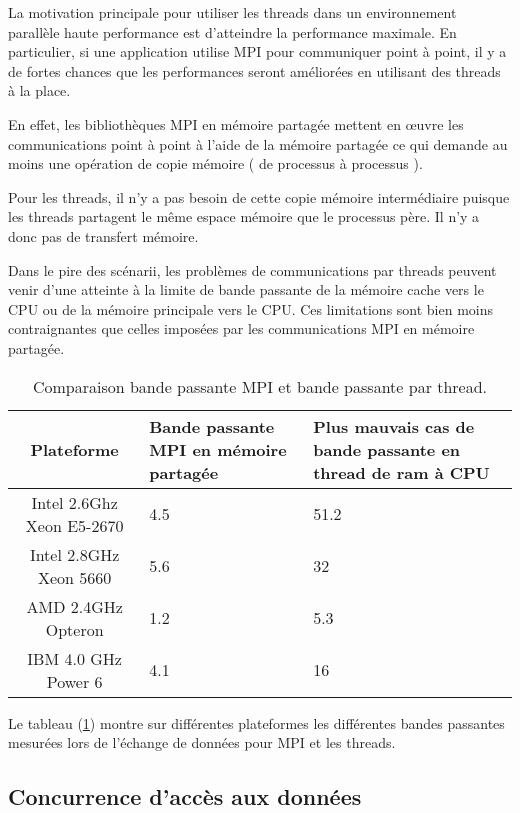 \documentclass[fleqn,11pt]{article}
\begin{document}
La motivation principale pour utiliser les threads dans un environnement parallèle haute performance est d'atteindre la performance maximale. En particulier, si une application utilise MPI pour communiquer point à point, il y a de fortes chances que les performances seront améliorées en utilisant des threads à la place.

En effet, les bibliothèques MPI en mémoire partagée mettent en {\oe}uvre les communications point à point à l'aide de la mémoire partagée ce qui demande au moins une opération de copie mémoire ( de processus à processus ).

Pour les threads, il n'y a pas besoin de cette copie mémoire intermédiaire puisque les threads partagent le même espace mémoire que le processus père. Il n'y a donc pas de transfert mémoire.

Dans le pire des scénarii, les problèmes de communications par threads peuvent venir d'une atteinte à la limite
de bande passante de la mémoire cache vers le CPU ou de la mémoire principale vers le CPU. Ces limitations sont bien moins contraignantes que celles imposées par les communications MPI en mémoire partagée.

\begin{table}[h]
 \begin{center}
  \begin{tabular}{|c|p{4cm}|p{4cm}|}\hline
   \rowcolor{lightgray!50} Plateforme & Bande passante MPI en mémoire partagée & Plus mauvais cas de bande passante en thread de ram à CPU \\ \hline
  Intel 2.6Ghz Xeon E5-2670 & 4.5 & 51.2 \\ \hline
  \rowcolor{lightgray!25}Intel 2.8GHz Xeon 5660 & 5.6 & 32 \\ \hline
  AMD   2.4GHz Opteron & 1.2 & 5.3 \\ \hline
 \rowcolor{lightgray!25}IBM 4.0 GHz Power 6 & 4.1 & 16 \\ \hline
  \end{tabular}
 \end{center}
  \caption{Comparaison bande passante MPI et bande passante par thread.}
  \label{tab::compMPIpt}
\end{table}


Le tableau (\ref{tab::compMPIpt}) 
montre sur différentes plateformes les différentes bandes passantes mesurées lors de l'échange de données pour MPI et les threads.

\subsection{Concurrence d'accès aux données}
\end{document}
